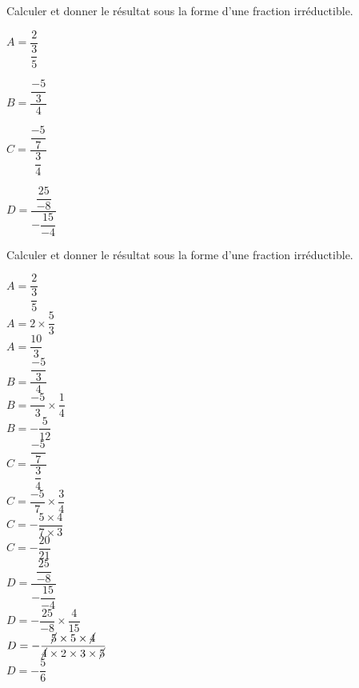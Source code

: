 \begin{exercice*}
    Calculer et donner le résultat sous la forme d'une fraction irréductible.
    \begin{multicols}{2}
        \begin{spacing}{2.5}
            \begin{list}{}{}
                \item $A=\dfrac{2}{\dfrac{3}{5}}$
                \item $B=\dfrac{\dfrac{-5}{3}}{4}$
                \item $C=\dfrac{\dfrac{-5}{7}}{\dfrac{3}{4}}$\smallskip
                \item $D=\dfrac{\dfrac{25}{-8}}{-\dfrac{15}{-4}}$
            \end{list}
        \end{spacing}
    \end{multicols}
\end{exercice*}
\begin{corrige}
    Calculer et donner le résultat sous la forme d'une fraction irréductible.
    \begin{multicols}{2}
        \begin{spacing}{2}
            \begin{itemize}
                \def\item{}
                \item $A=\dfrac{2}{\dfrac{3}{5}}$\\
                {\red $A=2\times\dfrac{5}{3}$\\$A=\dfrac{10}{3}$}\\
                \item $B=\dfrac{\dfrac{-5}{3}}{4}$\\
                {\red $B=\dfrac{-5}{3}\times\dfrac{1}{4}$\\$B=-\dfrac{5}{12}$}\\
                \columnbreak
                \item $C=\dfrac{\dfrac{-5}{7}}{\dfrac{3}{4}}$\\
                {\red $C=\dfrac{-5}{7}\times\dfrac{3}{4}$\\$C=-\dfrac{5\times 4}{7\times 3}$\\$C=-\dfrac{20}{21}$}\\
                \item $D=\dfrac{\dfrac{25}{-8}}{-\dfrac{15}{-4}}$\\
                {\red $D=-\dfrac{25}{-8}\times\dfrac{4}{15}$\\$D=-\dfrac{\cancel{5}\times 5\times\cancel{4}}{\cancel{4}\times 2\times 3\times\cancel{5}}$\\$D=-\dfrac{5}{6}$}
            \end{itemize}
        \end{spacing}
    \end{multicols}
\end{corrige}

